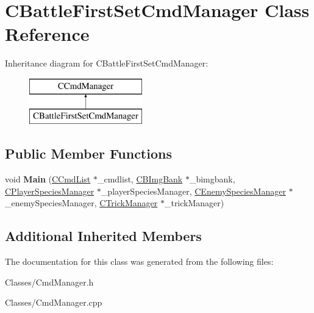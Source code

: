 \hypertarget{class_c_battle_first_set_cmd_manager}{}\section{C\+Battle\+First\+Set\+Cmd\+Manager Class Reference}
\label{class_c_battle_first_set_cmd_manager}
Inheritance diagram for C\+Battle\+First\+Set\+Cmd\+Manager\+:\begin{figure}[H]
\begin{center}
\leavevmode
\includegraphics[height=2.000000cm]{class_c_battle_first_set_cmd_manager}
\end{center}
\end{figure}
\subsection*{Public Member Functions}
\begin{DoxyCompactItemize}
\item 
void {\bfseries Main} (\hyperlink{class_c_cmd_list}{C\+Cmd\+List} $\ast$\+\_\+cmdlist, \hyperlink{class_c_b_img_bank}{C\+B\+Img\+Bank} $\ast$\+\_\+bimgbank, \hyperlink{class_c_player_species_manager}{C\+Player\+Species\+Manager} $\ast$\+\_\+player\+Species\+Manager, \hyperlink{class_c_enemy_species_manager}{C\+Enemy\+Species\+Manager} $\ast$\+\_\+enemy\+Species\+Manager, \hyperlink{class_c_trick_manager}{C\+Trick\+Manager} $\ast$\+\_\+trick\+Manager)\hypertarget{class_c_battle_first_set_cmd_manager_a7b8dd4aed45613fb84f85a7729f6999b}{}\label{class_c_battle_first_set_cmd_manager_a7b8dd4aed45613fb84f85a7729f6999b}

\end{DoxyCompactItemize}
\subsection*{Additional Inherited Members}


The documentation for this class was generated from the following files\+:\begin{DoxyCompactItemize}
\item 
Classes/Cmd\+Manager.\+h\item 
Classes/Cmd\+Manager.\+cpp\end{DoxyCompactItemize}
